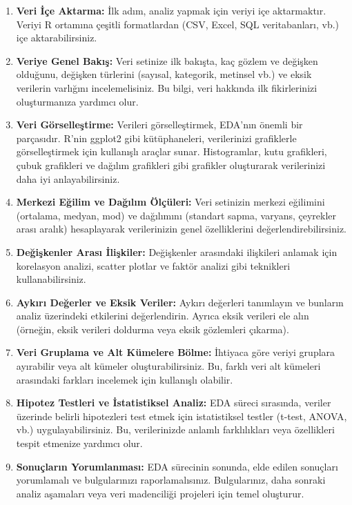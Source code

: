 \documentclass[
  letterpaper,
  DIV=11,
  numbers=noendperiod]{scrreprt}
\begin{document}
\begin{enumerate}
\def\labelenumi{\arabic{enumi}.}
\item
  \textbf{Veri İçe Aktarma:} İlk adım, analiz yapmak için veriyi içe
  aktarmaktır. Veriyi R ortamına çeşitli formatlardan (CSV, Excel, SQL
  veritabanları, vb.) içe aktarabilirsiniz.
\item
  \textbf{Veriye Genel Bakış:} Veri setinize ilk bakışta, kaç gözlem ve
  değişken olduğunu, değişken türlerini (sayısal, kategorik, metinsel
  vb.) ve eksik verilerin varlığını incelemelisiniz. Bu bilgi, veri
  hakkında ilk fikirlerinizi oluşturmanıza yardımcı olur.
\item
  \textbf{Veri Görselleştirme:} Verileri görselleştirmek, EDA'nın önemli
  bir parçasıdır. R'nin ggplot2 gibi kütüphaneleri, verilerinizi
  grafiklerle görselleştirmek için kullanışlı araçlar sunar.
  Histogramlar, kutu grafikleri, çubuk grafikleri ve dağılım grafikleri
  gibi grafikler oluşturarak verilerinizi daha iyi anlayabilirsiniz.
\item
  \textbf{Merkezi Eğilim ve Dağılım Ölçüleri:} Veri setinizin merkezi
  eğilimini (ortalama, medyan, mod) ve dağılımını (standart sapma,
  varyans, çeyrekler arası aralık) hesaplayarak verilerinizin genel
  özelliklerini değerlendirebilirsiniz.
\item
  \textbf{Değişkenler Arası İlişkiler:} Değişkenler arasındaki
  ilişkileri anlamak için korelasyon analizi, scatter plotlar ve faktör
  analizi gibi teknikleri kullanabilirsiniz.
\item
  \textbf{Aykırı Değerler ve Eksik Veriler:} Aykırı değerleri tanımlayın
  ve bunların analiz üzerindeki etkilerini değerlendirin. Ayrıca eksik
  verileri ele alın (örneğin, eksik verileri doldurma veya eksik
  gözlemleri çıkarma).
\item
  \textbf{Veri Gruplama ve Alt Kümelere Bölme:} İhtiyaca göre veriyi
  gruplara ayırabilir veya alt kümeler oluşturabilirsiniz. Bu, farklı
  veri alt kümeleri arasındaki farkları incelemek için kullanışlı
  olabilir.
\item
  \textbf{Hipotez Testleri ve İstatistiksel Analiz:} EDA süreci
  sırasında, veriler üzerinde belirli hipotezleri test etmek için
  istatistiksel testler (t-test, ANOVA, vb.) uygulayabilirsiniz. Bu,
  verilerinizde anlamlı farklılıkları veya özellikleri tespit etmenize
  yardımcı olur.
\item
  \textbf{Sonuçların Yorumlanması:} EDA sürecinin sonunda, elde edilen
  sonuçları yorumlamalı ve bulgularınızı raporlamalısınız. Bulgularınız,
  daha sonraki analiz aşamaları veya veri madenciliği projeleri için
  temel oluşturur.
\end{enumerate}
\end{document}
